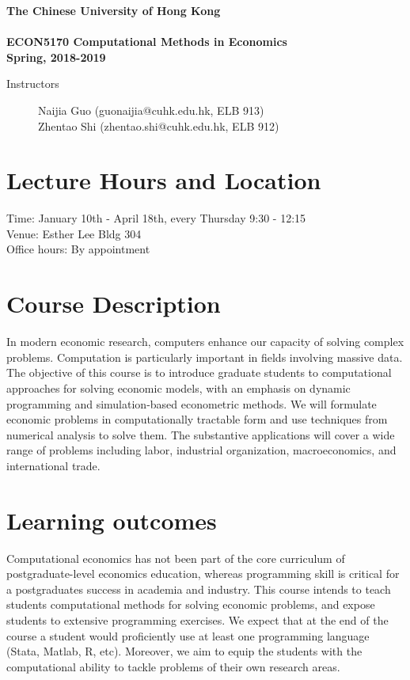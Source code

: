 \documentclass[11pt]{article}
\begin{document}
\begin{center}
  {\Large\bf The Chinese University of Hong Kong \\
  \ \\
ECON5170  Computational Methods in Economics \\
Spring, 2018-2019}
\end{center}

 \vspace{2pt}

\begin{description}
\item[Instructors] Naijia Guo (guonaijia@cuhk.edu.hk, ELB 913) \\
  Zhentao Shi (zhentao.shi@cuhk.edu.hk, ELB 912)
\end{description}

\section*{Lecture Hours and Location}
Time: January 10th - April 18th, every Thursday 9:30 - 12:15 \\
Venue: Esther Lee Bldg 304 \\
Office hours: By appointment




\section*{Course Description}

In modern economic research, computers enhance our capacity of solving complex problems. Computation is particularly important in fields involving massive data. The objective of this course is to introduce graduate students to computational approaches for solving economic models, with an emphasis on dynamic programming and simulation-based econometric methods. We will formulate economic problems in computationally tractable form and use techniques from numerical analysis to solve them. The substantive applications will cover a wide range of problems including labor, industrial organization, macroeconomics, and international trade.

\section*{Learning outcomes}

Computational economics has not been part of the core curriculum of postgraduate-level economics education, whereas programming skill is critical for a postgraduates success in academia and industry. This course intends to teach students computational methods for solving economic problems, and expose students to extensive programming exercises. We expect that at the end of the course a student would proficiently use at least one programming language (Stata, Matlab, R, etc). Moreover, we aim to equip the students with the computational ability to tackle problems of their own research areas.
\end{document}

